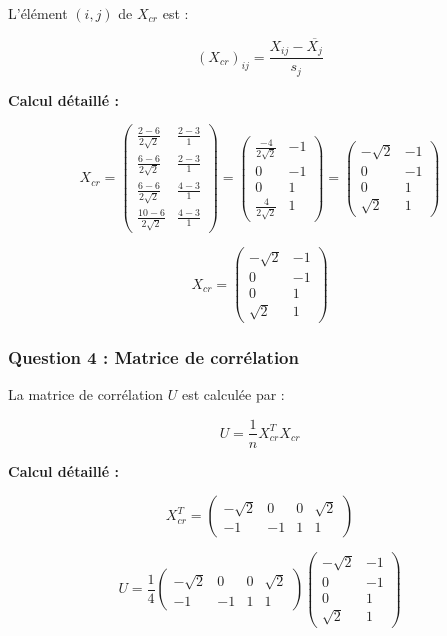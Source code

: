 \documentclass[11pt,a4paper]{article}
\begin{document}
L'élément $(i,j)$ de $X_{cr}$ est :

$$(X_{cr})_{ij} = \frac{X_{ij} - \overline{X_j}}{s_j}$$

\textbf{Calcul détaillé :}

$$X_{cr} = \begin{pmatrix}
\frac{2-6}{2\sqrt{2}} & \frac{2-3}{1} \\
\frac{6-6}{2\sqrt{2}} & \frac{2-3}{1} \\
\frac{6-6}{2\sqrt{2}} & \frac{4-3}{1} \\
\frac{10-6}{2\sqrt{2}} & \frac{4-3}{1}
\end{pmatrix} = \begin{pmatrix}
\frac{-4}{2\sqrt{2}} & -1 \\
0 & -1 \\
0 & 1 \\
\frac{4}{2\sqrt{2}} & 1
\end{pmatrix} = \begin{pmatrix}
-\sqrt{2} & -1 \\
0 & -1 \\
0 & 1 \\
\sqrt{2} & 1
\end{pmatrix}$$

$$\boxed{X_{cr} = \begin{pmatrix}
-\sqrt{2} & -1 \\
0 & -1 \\
0 & 1 \\
\sqrt{2} & 1
\end{pmatrix}}$$

\subsubsection{Question 4 : Matrice de corrélation}

La matrice de corrélation $U$ est calculée par :

$$U = \frac{1}{n} X_{cr}^T X_{cr}$$

\textbf{Calcul détaillé :}

$$X_{cr}^T = \begin{pmatrix}
-\sqrt{2} & 0 & 0 & \sqrt{2} \\
-1 & -1 & 1 & 1
\end{pmatrix}$$

$$U = \frac{1}{4} \begin{pmatrix}
-\sqrt{2} & 0 & 0 & \sqrt{2} \\
-1 & -1 & 1 & 1
\end{pmatrix} \begin{pmatrix}
-\sqrt{2} & -1 \\
0 & -1 \\
0 & 1 \\
\sqrt{2} & 1
\end{pmatrix}$$
\end{document}
